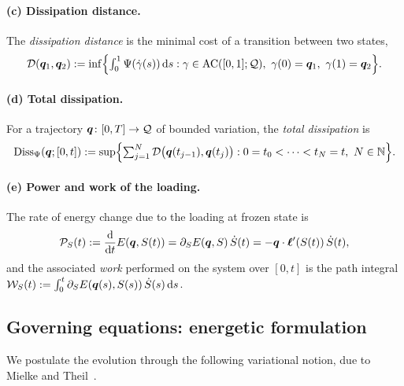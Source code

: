 \paragraph{(c) Dissipation distance.}
The \emph{dissipation distance} is the minimal cost of a transition
between two states,
\begin{equation}\label{eq:diss_dist}
  \mathcal{D}(\bm{q}_1,\bm{q}_2)
  := \inf\Bigl\{\textstyle\int_0^1 \Psi(\dot\gamma(s))\mathop{}\!\mathrm{d} s :
  \gamma\in\mathrm{AC}([0,1];\mathcal{Q}),\ \gamma(0)=\bm{q}_1,\ \gamma(1)=\bm{q}_2\Bigr\}.
\end{equation}

\paragraph{(d) Total dissipation.}
For a trajectory $\bm{q}\colon[0,T]\to\mathcal{Q}$ of bounded variation, the
\emph{total dissipation} is
\begin{equation}\label{eq:total_diss}
  \mathrm{Diss}_\Psi(\bm{q};[0,t])
  := \sup\Bigl\{\textstyle\sum_{j=1}^{N}\mathcal{D}\bigl(\bm{q}(t_{j-1}),\bm{q}(t_j)\bigr):
  0=t_0<\dots<t_N=t,\ N\in\mathbb{N}\Bigr\}.
\end{equation}

\paragraph{(e) Power and work of the loading.}
The rate of energy change due to the loading at frozen state is
\begin{equation}\label{eq:power}
  \mathcal P_S(t) := \frac{\mathop{}\!\mathrm{d}}{\mathop{}\!\mathrm{d} t} E(\bm{q}, S(t))
  = \partial_S E(\bm{q}, S)\,\dot S(t)
  = -\bm{q}\cdot\bm{\ell}'(S(t))\,\dot S(t),
\end{equation}
and the associated \emph{work} performed on the system over $[0,t]$ is the path integral $\mathcal W_S(t):=\int_0^t\partial_S E(\bm{q}(s),S(s))\,\dot S(s)\mathop{}\!\mathrm{d} s$.

\subsection{Governing equations: energetic formulation}
\label{sec:energetic}

We postulate the evolution through the following variational notion,
due to Mielke and Theil~\cite{MielkeTheil}.

